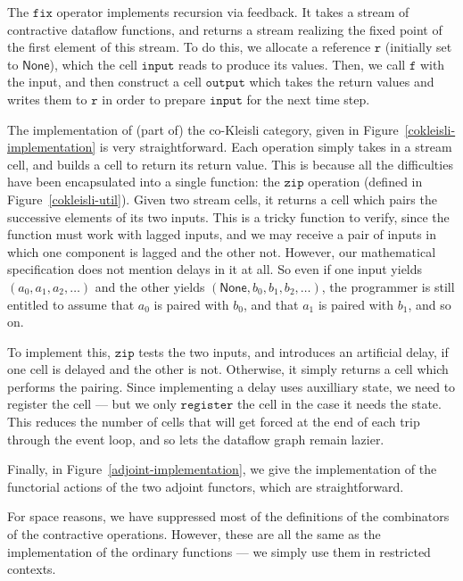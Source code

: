 \documentclass[nocopyrightspace,preprint]{sigplanconf}
\newcommand{\term}[1]{\ensuremath{\mathtt{{#1}}}}
\newcommand{\None}{\mathsf{None}}
\begin{document}
The $\term{fix}$ operator implements recursion via feedback. It takes
a stream of contractive dataflow functions, and returns a stream
realizing the fixed point of the first element of this stream. To do
this, we allocate a reference \term{r} (initially set to $\None$), which
the cell \term{input} reads to produce its values. Then, we call \term{f}
with the input, and then construct a cell \term{output} which takes the
return values and writes them to \term{r} in order to prepare \term{input}
for the next time step. 

The implementation of (part of) the co-Kleisli category, given in
Figure~\ref{cokleisli-implementation} is very straightforward. Each
operation simply takes in a stream cell, and builds a cell to return
its return value. This is because all the difficulties have been
encapsulated into a single function: the \term{zip} operation (defined
in Figure~\ref{cokleisli-util}). Given two stream cells, it returns a
cell which pairs the successive elements of its two inputs. This is a
tricky function to verify, since the function must work with lagged
inputs, and we may receive a pair of inputs in which one component is
lagged and the other not. However, our mathematical specification does
not mention delays in it at all. So even if one input yields $(a_0,
a_1, a_2, \ldots)$ and the other yields $(\None, b_0, b_1, b_2,
\ldots)$, the programmer is still entitled to assume that $a_0$ is
paired with $b_0$, and that $a_1$ is paired with $b_1$, and so on.

To implement this, \term{zip} tests the two inputs, and introduces an
artificial delay, if one cell is delayed and the other is not.
Otherwise, it simply returns a cell which performs the pairing. Since
implementing a delay uses auxilliary state, we need to register the
cell --- but we only \term{register} the cell in the case it needs the
state. This reduces the number of cells that will get forced at the
end of each trip through the event loop, and so lets the dataflow
graph remain lazier.

Finally, in Figure~\ref{adjoint-implementation}, we give the
implementation of the functorial actions of the two adjoint functors,
which are straightforward. 

For space reasons, we have suppressed most of the definitions of the
combinators of the contractive operations. However, these are all 
the same as the implementation of the ordinary functions --- we simply
use them in restricted contexts.
\end{document}
